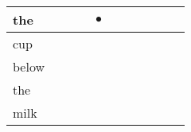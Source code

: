 \documentclass[landscape]{article}
\newcommand{\ssp}{\hspace{2pt}}
\newcommand{\mex}{\cellcolor{g}$\bullet$}
\begin{document}
\begin{tabular}{|l|p{10pt}|p{10pt}|p{10pt}|p{10pt}|p{10pt}|p{10pt}|p{10pt}|p{10pt}|p{10pt}|p{10pt}|}
\hline
\ssp \cellcolor{ref3}the \ssp&\hspace{2pt}&\hspace{2pt}&\hspace{2pt}&\hspace{2pt}\mex&\hspace{2pt}&\hspace{2pt}&\hspace{2pt}&\hspace{2pt}&\hspace{2pt}&\hspace{2pt}\\
\hline
\ssp cup \ssp&\hspace{2pt}&\hspace{2pt}&\hspace{2pt}&\hspace{2pt}&\hspace{2pt}&\hspace{2pt}&\hspace{2pt}&\hspace{2pt}&\hspace{2pt}&\hspace{2pt}\\
\hline
\ssp below \ssp&\hspace{2pt}&\hspace{2pt}&\hspace{2pt}&\hspace{2pt}&\hspace{2pt}&\hspace{2pt}&\hspace{2pt}&\hspace{2pt}&\hspace{2pt}&\hspace{2pt}\\
\hline
\ssp the \ssp&\hspace{2pt}&\hspace{2pt}&\hspace{2pt}&\hspace{2pt}&\hspace{2pt}&\hspace{2pt}&\hspace{2pt}&\hspace{2pt}&\hspace{2pt}&\hspace{2pt}\\
\hline
\ssp milk \ssp&\hspace{2pt}&\hspace{2pt}&\hspace{2pt}&\hspace{2pt}&\hspace{2pt}&\hspace{2pt}&\hspace{2pt}&\hspace{2pt}&\hspace{2pt}&\hspace{2pt}\\

\end{tabular}
\end{document}
